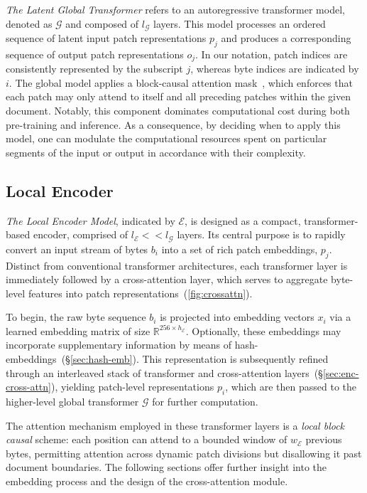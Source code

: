 \textit{The Latent Global Transformer} refers to an autoregressive transformer model, denoted as $\mathcal{G}$ and composed of $l_{\mathcal{G}}$ layers. This model processes an ordered sequence of latent input patch representations $p_j$ and produces a corresponding sequence of output patch representations $o_j$. In our notation, patch indices are consistently represented by the subscript $j$, whereas byte indices are indicated by $i$. The global model applies a block-causal attention mask~\citep{dubey2024llama}, which enforces that each patch may only attend to itself and all preceding patches within the given document. Notably, this component dominates computational cost during both pre-training and inference. As a consequence, by deciding when to apply this model, one can modulate the computational resources spent on particular segments of the input or output in accordance with their complexity.

\subsection{Local Encoder}
\label{section:local}

\textit{The Local Encoder Model}, indicated by $\mathcal{E}$, is designed as a compact, transformer-based encoder, comprised of $l_{\mathcal{E}} << l_{\mathcal{G}}$ layers. Its central purpose is to rapidly convert an input stream of bytes $b_i$ into a set of rich patch embeddings, $p_j$. Distinct from conventional transformer architectures, each transformer layer is immediately followed by a cross-attention layer, which serves to aggregate byte-level features into patch representations~(\autoref{fig:crossattn}).

To begin, the raw byte sequence $b_i$ is projected into embedding vectors $x_i$ via a learned embedding matrix of size $\mathbb{R}^{256 \times h_{\mathcal{E}}}$. Optionally, these embeddings may incorporate supplementary information by means of hash-embeddings~(\S\ref{sec:hash-emb}). This representation is subsequently refined through an interleaved stack of transformer and cross-attention layers~(\S\ref{sec:enc-cross-attn}), yielding patch-level representations $p_i$, which are then passed to the higher-level global transformer $\mathcal{G}$ for further computation.

The attention mechanism employed in these transformer layers is a \textit{local block causal} scheme: each position can attend to a bounded window of $w_{\mathcal{E}}$ previous bytes, permitting attention across dynamic patch divisions but disallowing it past document boundaries. The following sections offer further insight into the embedding process and the design of the cross-attention module.


